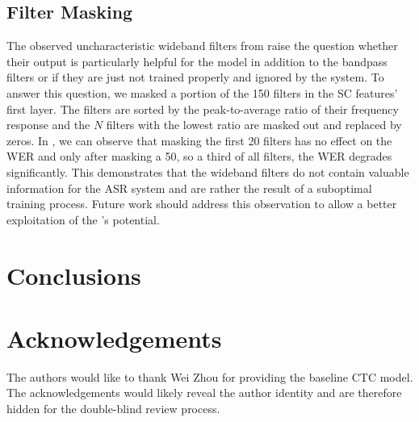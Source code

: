 \documentclass{INTERSPEECH2023}
\begin{document}
\subsection{Filter Masking}

The observed uncharacteristic wideband filters from  raise the question whether their output is particularly helpful for the model in addition to the bandpass filters or if they are just not trained properly and ignored by the system.
To answer this question, we masked a portion of the 150 filters in the \gls{SC} features' first layer.
The filters are sorted by the peak-to-average ratio of their frequency response and the $N$ filters with the lowest ratio are masked out and replaced by zeros.
In , we can observe that masking the first 20 filters has no effect on the \gls{WER} and only after masking a 50, so a third of all filters, the \gls{WER} degrades significantly.
This demonstrates that the wideband filters do not contain valuable information for the \gls{ASR} system and are rather the result of a suboptimal training process.
Future work should address this observation to allow a better exploitation of the \fe's potential.

\section{Conclusions}

\section{Acknowledgements}

\ifinterspeechfinal
     The authors would like to thank Wei Zhou for providing the baseline \gls{CTC} model.
\else
     The acknowledgements would likely reveal the author identity and are therefore hidden for the double-blind review process.
\fi



\end{document}
